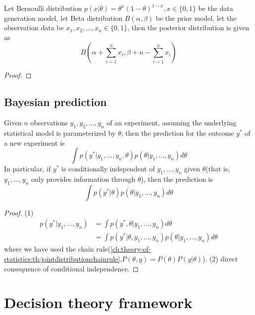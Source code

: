 \begin{refsection}
\begin{lemma}[Bernoulli]
	Let Bernoulli distribution $p(x|\theta) = \theta^x(1-\theta)^{1-x},x\in \{0,1\}$ be the data generation model, let Beta distribution $B(\alpha,\beta)$ be the prior model, let the observation data be $x_1,x_2,...,x_n \in \{0,1\}$, then the posterior distribution is given as
	$$B(\alpha + \sum_{i=1}^n x_i,\beta + n - \sum_{i=1}^n x_i)$$
\end{lemma}
\begin{proof}
	
\end{proof}



\subsection{Bayesian prediction}
\begin{lemma}
	Given $n$ observations $y_1,y_2,...,y_n$ of an experiment, assuming the underlying statistical model is parameterized by $\theta$, then the prediction for the outcome $y^*$ of a new experiment is
	$$\int p(y^*|y_1,...,y_n,\theta)p(\theta|y_1,...,y_n)d\theta$$
	In particular, if $y^*$ is conditionally independent of $y_1,...,y_n$ given $\theta$(that is, $y_1,...,y_n$ only provides information through $\theta$), then the prediction is
	$$\int p(y^*|\theta)p(\theta|y_1,...,y_n)d\theta$$	
\end{lemma}
\begin{proof}
	(1)
	\begin{align*}
	p(y^*|y_1,...,y_n) &= \int p(y^*,\theta|y_1,...,y_n) d\theta \\
	&=\int p(y^*|\theta, y_1,...,y_n)p(\theta|y_1,...,y_n) d\theta 
	\end{align*}
	where we have used the chain rule(\autoref{ch:theory-of-statistics:th:jointdistributionchainrule},$P(\theta,y)=P(\theta)P(y|\theta)$).
	(2) direct consequence of conditional independence.
\end{proof}




\section{Decision theory framework}

\end{refsection}
